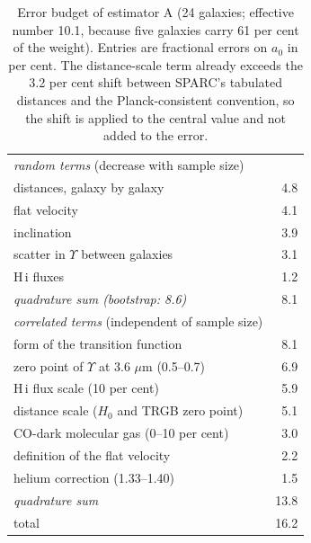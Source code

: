 \documentclass[fleqn,usenatbib]{mnras}
\begin{document}
\begin{table}
\caption{Error budget of estimator A (24 galaxies; effective number 10.1, because five galaxies carry 61 per cent of the weight). Entries are fractional errors on $a_0$ in per cent. The distance-scale term already exceeds the 3.2 per cent shift between SPARC's tabulated distances and the Planck-consistent convention, so the shift is applied to the central value and not added to the error.}
\label{tab:budget}
\begin{tabular}{lr}
\toprule
\emph{random terms} (decrease with sample size) & \\
\quad distances, galaxy by galaxy & 4.8\\
\quad flat velocity & 4.1\\
\quad inclination & 3.9\\
\quad scatter in $\Upsilon$ between galaxies & 3.1\\
\quad H\,{\sc i} fluxes & 1.2\\
\quad \emph{quadrature sum (bootstrap: 8.6)} & 8.1\\
\midrule
\emph{correlated terms} (independent of sample size) & \\
\quad form of the transition function & 8.1\\
\quad zero point of $\Upsilon$ at 3.6 $\mu$m (0.5--0.7) & 6.9\\
\quad H\,{\sc i} flux scale (10 per cent) & 5.9\\
\quad distance scale ($H_0$ and TRGB zero point) & 5.1\\
\quad CO-dark molecular gas (0--10 per cent) & 3.0\\
\quad definition of the flat velocity & 2.2\\
\quad helium correction (1.33--1.40) & 1.5\\
\quad \emph{quadrature sum} & 13.8\\
\midrule
total & 16.2\\
\bottomrule
\end{tabular}
\end{table}
\end{document}
